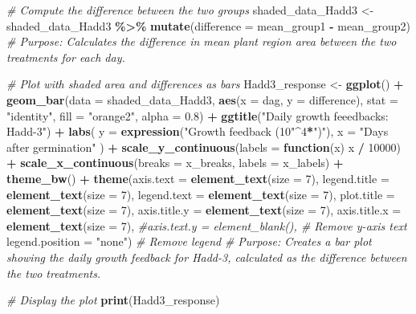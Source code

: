 \documentclass[
  11pt,
]{article}
\newenvironment{Shaded}{\begin{snugshade}}{\end{snugshade}}
\newcommand{\AttributeTok}[1]{\textcolor[rgb]{0.13,0.29,0.53}{#1}}
\newcommand{\CommentTok}[1]{\textcolor[rgb]{0.56,0.35,0.01}{\textit{#1}}}
\newcommand{\ControlFlowTok}[1]{\textcolor[rgb]{0.13,0.29,0.53}{\textbf{#1}}}
\newcommand{\DecValTok}[1]{\textcolor[rgb]{0.00,0.00,0.81}{#1}}
\newcommand{\FloatTok}[1]{\textcolor[rgb]{0.00,0.00,0.81}{#1}}
\newcommand{\FunctionTok}[1]{\textcolor[rgb]{0.13,0.29,0.53}{\textbf{#1}}}
\newcommand{\NormalTok}[1]{#1}
\newcommand{\OtherTok}[1]{\textcolor[rgb]{0.56,0.35,0.01}{#1}}
\newcommand{\SpecialCharTok}[1]{\textcolor[rgb]{0.81,0.36,0.00}{\textbf{#1}}}
\newcommand{\StringTok}[1]{\textcolor[rgb]{0.31,0.60,0.02}{#1}}
\begin{document}
\begin{Shaded}
\begin{Highlighting}[]
\CommentTok{\# Compute the difference between the two groups}
\NormalTok{shaded\_data\_Hadd3 }\OtherTok{\textless{}{-}}\NormalTok{ shaded\_data\_Hadd3 }\SpecialCharTok{\%\textgreater{}\%}
  \FunctionTok{mutate}\NormalTok{(}\AttributeTok{difference =}\NormalTok{ mean\_group1 }\SpecialCharTok{{-}}\NormalTok{ mean\_group2)}
\CommentTok{\# Purpose: Calculates the difference in mean plant region area between the two treatments for each day.}

\CommentTok{\# Plot with shaded area and differences as bars}
\NormalTok{Hadd3\_response }\OtherTok{\textless{}{-}} \FunctionTok{ggplot}\NormalTok{() }\SpecialCharTok{+}
  \FunctionTok{geom\_bar}\NormalTok{(}\AttributeTok{data =}\NormalTok{ shaded\_data\_Hadd3, }\FunctionTok{aes}\NormalTok{(}\AttributeTok{x =}\NormalTok{ dag, }\AttributeTok{y =}\NormalTok{ difference), }\AttributeTok{stat =} \StringTok{"identity"}\NormalTok{, }\AttributeTok{fill =} \StringTok{"orange2"}\NormalTok{, }\AttributeTok{alpha =} \FloatTok{0.8}\NormalTok{) }\SpecialCharTok{+}
  \FunctionTok{ggtitle}\NormalTok{(}\StringTok{"Daily growth feeedbacks: Hadd{-}3"}\NormalTok{) }\SpecialCharTok{+}
  \FunctionTok{labs}\NormalTok{(}
    \AttributeTok{y =} \FunctionTok{expression}\NormalTok{(}\StringTok{"Growth feedback (10"}\SpecialCharTok{\^{}}\DecValTok{4}\SpecialCharTok{*}\StringTok{")"}\NormalTok{), }
    \AttributeTok{x =} \StringTok{"Days after germination"}
\NormalTok{  ) }\SpecialCharTok{+}
  \FunctionTok{scale\_y\_continuous}\NormalTok{(}\AttributeTok{labels =} \ControlFlowTok{function}\NormalTok{(x) x }\SpecialCharTok{/} \DecValTok{10000}\NormalTok{) }\SpecialCharTok{+}
  \FunctionTok{scale\_x\_continuous}\NormalTok{(}\AttributeTok{breaks =}\NormalTok{ x\_breaks, }\AttributeTok{labels =}\NormalTok{ x\_labels) }\SpecialCharTok{+}
  \FunctionTok{theme\_bw}\NormalTok{() }\SpecialCharTok{+}
  \FunctionTok{theme}\NormalTok{(}\AttributeTok{axis.text =} \FunctionTok{element\_text}\NormalTok{(}\AttributeTok{size =} \DecValTok{7}\NormalTok{),}
        \AttributeTok{legend.title =} \FunctionTok{element\_text}\NormalTok{(}\AttributeTok{size =} \DecValTok{7}\NormalTok{),}
        \AttributeTok{legend.text =} \FunctionTok{element\_text}\NormalTok{(}\AttributeTok{size =} \DecValTok{7}\NormalTok{),}
        \AttributeTok{plot.title =} \FunctionTok{element\_text}\NormalTok{(}\AttributeTok{size =} \DecValTok{7}\NormalTok{),}
        \AttributeTok{axis.title.y =} \FunctionTok{element\_text}\NormalTok{(}\AttributeTok{size =} \DecValTok{7}\NormalTok{),}
        \AttributeTok{axis.title.x =} \FunctionTok{element\_text}\NormalTok{(}\AttributeTok{size =} \DecValTok{7}\NormalTok{),}
        \CommentTok{\#axis.text.y = element\_blank(),  \# Remove y{-}axis text}
        \AttributeTok{legend.position =} \StringTok{"none"}\NormalTok{)       }\CommentTok{\# Remove legend}
\CommentTok{\# Purpose: Creates a bar plot showing the daily growth feedback for Hadd{-}3, calculated as the difference between the two treatments.}

\CommentTok{\# Display the plot}
\FunctionTok{print}\NormalTok{(Hadd3\_response)}
\end{Highlighting}
\end{Shaded}
\end{document}
